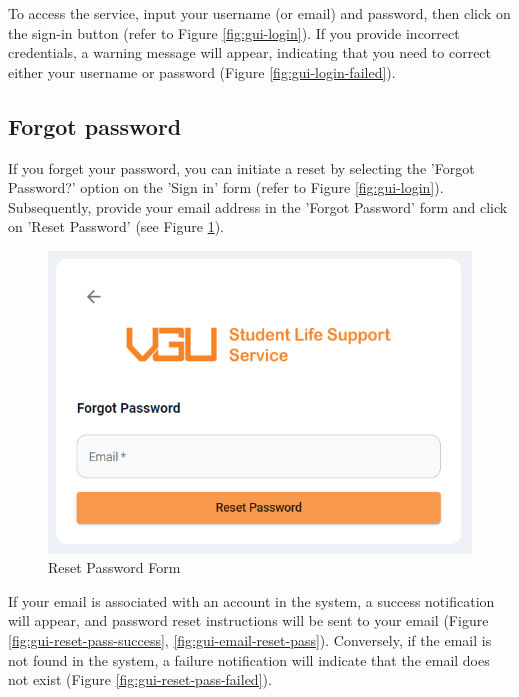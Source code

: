


To access the service, input your username (or email) and password, then click on the sign-in button (refer to Figure \ref{fig:gui-login}). If you provide incorrect credentials, a warning message will appear, indicating that you need to correct either your username or password (Figure \ref{fig:gui-login-failed}).





\subsection{Forgot password}


If you forget your password, you can initiate a reset by selecting the 'Forgot Password?' option on the 'Sign in' form (refer to Figure \ref{fig:gui-login}). Subsequently, provide your email address in the 'Forgot Password' form and click on 'Reset Password' (see Figure \ref{fig:gui-forgot-pass}).

\begin{figure}[H]
	\centering
	\includegraphics[width=0.7\linewidth]{graphics/gui/user/reset-pass.png}
	\caption{Reset Password Form}
	\label{fig:gui-forgot-pass}
\end{figure}



If your email is associated with an account in the system, a success notification will appear, and password reset instructions will be sent to your email (Figure \ref{fig:gui-reset-pass-success}, \ref{fig:gui-email-reset-pass}).  Conversely, if the email is not found in the system, a failure notification will indicate that the email does not exist (Figure \ref{fig:gui-reset-pass-failed}).

